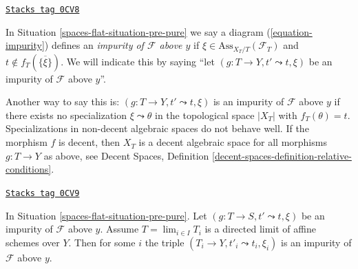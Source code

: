 \begin{definition}[Impurity]
\label{spaces-flat-definition-impurity}
\href{https://stacks.math.columbia.edu/tag/0CV8}{\texttt{Stacks tag 0CV8}}

In
Situation \ref{spaces-flat-situation-pre-pure}
we say a diagram (\ref{equation-impurity}) defines an
{\it impurity of $\mathcal{F}$ above $y$}
if $\xi \in \text{Ass}_{X_T/T}(\mathcal{F}_T)$ and
$t \not \in f_T(\overline{\{\xi\}})$. We will indicate
this by saying ``let $(g : T \to Y, t' \leadsto t, \xi)$ be
an impurity of $\mathcal{F}$ above $y$''.
\end{definition}

Another way to say this is: $(g : T \to Y, t' \leadsto t, \xi)$ is
an impurity of $\mathcal{F}$ above $y$ if there exists no specialization
$\xi \leadsto \theta$ in the topological space $|X_T|$ with
$f_T(\theta) = t$. Specializations in non-decent algebraic spaces
do not behave well. If the morphism $f$ is decent, then $X_T$
is a decent algebraic space for all morphisms $g : T \to Y$ as above, see
Decent Spaces, Definition \ref{decent-spaces-definition-relative-conditions}.

\begin{lemma}
\label{spaces-flat-lemma-impure-limit}
\href{https://stacks.math.columbia.edu/tag/0CV9}{\texttt{Stacks tag 0CV9}}

In Situation \ref{spaces-flat-situation-pre-pure}.
Let $(g : T \to S, t' \leadsto t, \xi)$ be an impurity of
$\mathcal{F}$ above $y$. Assume $T = \lim_{i \in I} T_i$ is a directed limit
of affine schemes over $Y$. Then for some $i$ the triple
$(T_i \to Y, t'_i \leadsto t_i, \xi_i)$ is an impurity of
$\mathcal{F}$ above $y$.
\end{lemma}

